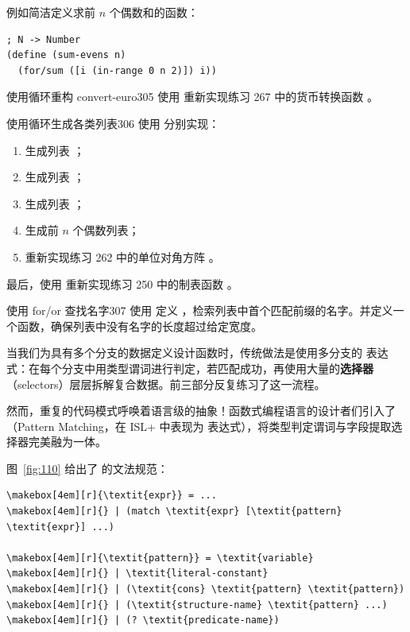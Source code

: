 例如简洁定义求前 $n$ 个偶数和的函数：
\begin{lstlisting}[language=BSL]
; N -> Number
(define (sum-evens n)
  (for/sum ([i (in-range 0 n 2)]) i))
\end{lstlisting}

\begin{exercise}{使用循环重构 convert-euro}{305}
使用  重新实现练习 267 中的货币转换函数 。
\end{exercise}

\begin{exercise}{使用循环生成各类列表}{306}
使用  分别实现：
\begin{enumerate}
  \item 生成列表 ；
  \item 生成列表 ；
  \item 生成列表 ；
  \item 生成前 $n$ 个偶数列表；
  \item 重新实现练习 262 中的单位对角方阵 。
\end{enumerate}
最后，使用  重新实现练习 250 中的制表函数 。
\end{exercise}

\begin{exercise}{使用 for/or 查找名字}{307}
使用  定义 ，检索列表中首个匹配前缀的名字。并定义一个函数，确保列表中没有名字的长度超过给定宽度。
\end{exercise}

\label{sec:intermezzo03_match}

当我们为具有多个分支的数据定义设计函数时，传统做法是使用多分支的  表达式：在每个分支中用类型谓词进行判定，若匹配成功，再使用大量的\textbf{选择器}（selectors）层层拆解复合数据。前三部分反复练习了这一流程。

然而，重复的代码模式呼唤着语言级的抽象！函数式编程语言的设计者们引入了（Pattern Matching，在 ISL+ 中表现为  表达式），将类型判定谓词与字段提取选择器完美融为一体。

图~\ref{fig:110} 给出了  的文法规范：

\begin{stepperbox}[unbreakable]
\begin{Verbatim}[commandchars=\\\{\}, fontsize=\footnotesize]
\makebox[4em][r]{\textit{expr}} = ...
\makebox[4em][r]{} | (match \textit{expr} [\textit{pattern} \textit{expr}] ...)

\makebox[4em][r]{\textit{pattern}} = \textit{variable}
\makebox[4em][r]{} | \textit{literal-constant}
\makebox[4em][r]{} | (\textit{cons} \textit{pattern} \textit{pattern})
\makebox[4em][r]{} | (\textit{structure-name} \textit{pattern} ...)
\makebox[4em][r]{} | (? \textit{predicate-name})
\end{Verbatim}
\end{stepperbox}
\label{fig:110}

